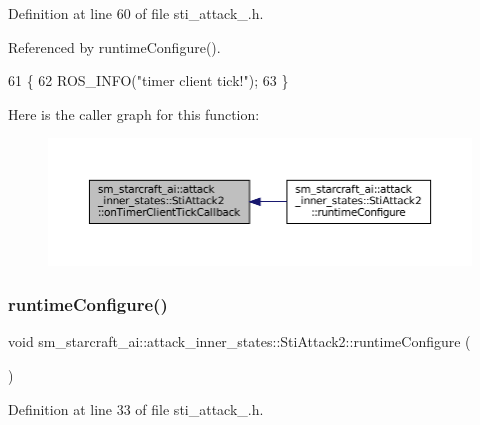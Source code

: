 Definition at line 60 of file sti\+\_\+attack\+\_.\+h.



Referenced by runtime\+Configure().


\begin{DoxyCode}
61   \{
62     ROS\_INFO(\textcolor{stringliteral}{"timer client tick!"});
63   \}
\end{DoxyCode}
Here is the caller graph for this function\+:
\nopagebreak
\begin{figure}[H]
\begin{center}
\leavevmode
\includegraphics[width=350pt]{structsm__starcraft__ai_1_1attack__inner__states_1_1StiAttack2_ab61b51291174e84b4ebf137101703e65_icgraph}
\end{center}
\end{figure}
\mbox{\label{structsm__starcraft__ai_1_1attack__inner__states_1_1StiAttack2_a301b74115e7af337d1f3883eb800a7a6}} 
\subsubsection{\texorpdfstring{runtime\+Configure()}{runtimeConfigure()}}
{\footnotesize\ttfamily void sm\+\_\+starcraft\+\_\+ai\+::attack\+\_\+inner\+\_\+states\+::\+Sti\+Attack2\+::runtime\+Configure (\begin{DoxyParamCaption}{ }\end{DoxyParamCaption})\hspace{0.3cm}{\ttfamily [inline]}}



Definition at line 33 of file sti\+\_\+attack\+\_.\+h.



